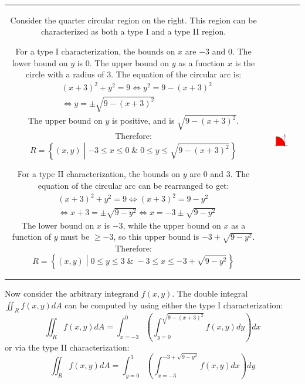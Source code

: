 \documentclass{article}
\begin{document}
\begin{tabular}{cc}
\parbox{0.5\textwidth}{
Consider the quarter circular region on the right. This region can be characterized as both a type I and a type II region.    

For a type I characterization, the bounds on \(x\) are \(-3\) and \(0\). The lower bound on \(y\) is \(0\). The upper bound on \(y\) as a function \(x\) is the circle with a radius of \(3\). The equation of the circular arc is: 
\begin{align*}
& (x + 3)^2 + y^2 = 9 
\iff y^2 = 9 - (x + 3)^2 \\
& \iff y = \pm\sqrt{9 - (x + 3)^2}
\end{align*}
The upper bound on \(y\) is positive, and is \(\sqrt{9 - (x + 3)^2}\). Therefore:
\[R = \left\{(x,y) \middle| -3 \leq x \leq 0 \;\&\; 0 \leq y \leq \sqrt{9 - (x + 3)^2}\right\}\]

For a type II characterization, the bounds on \(y\) are \(0\) and \(3\). The equation of the circular arc can be rearranged to get: 
\begin{align*}
& (x + 3)^2 + y^2 = 9 
\iff (x + 3)^2 = 9 - y^2 \\
& \iff x + 3 = \pm\sqrt{9 - y^2} 
\iff x = -3 \pm \sqrt{9 - y^2} 
\end{align*}
The lower bound on \(x\) is \(-3\), while the upper bound on \(x\) as a function of \(y\) must be \(\geq -3\), so this upper bound is \(-3 + \sqrt{9 - y^2}\). Therefore:
\[R = \left\{(x,y) \middle| 0 \leq y \leq 3 \;\&\; -3 \leq x \leq -3 + \sqrt{9 - y^2}\right\}\]

} & \parbox{0.5\textwidth}{
\includegraphics[width = 0.5\textwidth]{Example_4}
}
\end{tabular}
Now consider the arbitrary integrand \(f(x,y)\). The double integral \(\iint_R f(x,y)dA\) can be computed by using either the type I characterization: 
\[\iint_R f(x,y)dA = \int_{x = -3}^0 \left(\int_{y = 0}^{\sqrt{9 - (x + 3)^2}} f(x,y)dy\right)dx\] 
or via the type II characterization: 
\[\iint_R f(x,y)dA = \int_{y = 0}^3 \left(\int_{x = -3}^{-3 + \sqrt{9 - y^2}} f(x,y)dx\right)dy\]
\end{document}
